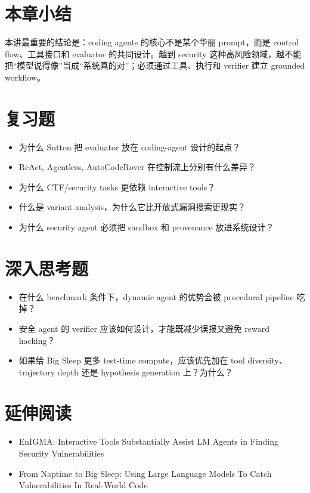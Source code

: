 \section{本章小结}
本讲最重要的结论是：coding agents 的核心不是某个华丽 prompt，而是 control flow、工具接口和 evaluator 的共同设计。越到 security 这种高风险领域，越不能把“模型说得像”当成“系统真的对”；必须通过工具、执行和 verifier 建立 grounded workflow。

\section{复习题}
\begin{itemize}
\item 为什么 Sutton 把 evaluator 放在 coding-agent 设计的起点？
\item ReAct, Agentless, AutoCodeRover 在控制流上分别有什么差异？
\item 为什么 CTF/security tasks 更依赖 interactive tools？
\item 什么是 variant analysis，为什么它比开放式漏洞搜索更现实？
\item 为什么 security agent 必须把 sandbox 和 provenance 放进系统设计？
\end{itemize}

\section{深入思考题}
\begin{itemize}
\item 在什么 benchmark 条件下，dynamic agent 的优势会被 procedural pipeline 吃掉？
\item 安全 agent 的 verifier 应该如何设计，才能既减少误报又避免 reward hacking？
\item 如果给 Big Sleep 更多 test-time compute，应该优先加在 tool diversity、trajectory depth 还是 hypothesis generation 上？为什么？
\end{itemize}

\section{延伸阅读}
\begin{itemize}
\item EnIGMA: Interactive Tools Substantially Assist LM Agents in Finding Security Vulnerabilities
\item From Naptime to Big Sleep: Using Large Language Models To Catch Vulnerabilities In Real-World Code
\end{itemize}
